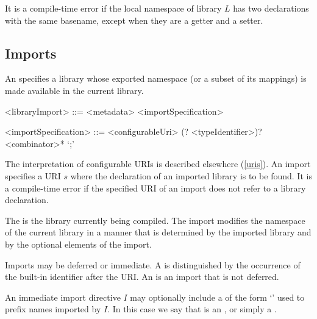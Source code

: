 \documentclass[makeidx]{article}
\begin{document}
{\LMHash{}%
It is a compile-time error if the local namespace of library $L$
has two declarations with the same basename,
except when they are a getter and a setter.



\subsection{Imports}

\LMHash{}%
An  specifies a library whose exported namespace
(or a subset of its mappings) is made available in the current library.

\begin{grammar}
<libraryImport> ::= <metadata> <importSpecification>

<importSpecification> ::= \gnewline{}
  \IMPORT{} <configurableUri>
  (\DEFERRED? \AS{} <typeIdentifier>)?
  <combinator>* `;'
\end{grammar}

\LMHash{}%
The interpretation of configurable URIs is described elsewhere
(\ref{uris}).
An import specifies a URI $s$
where the declaration of an imported library is to be found.
It is a compile-time error if the specified URI of an import
does not refer to a library declaration.

\LMHash{}%
The  is the library currently being compiled.
The import modifies the namespace of the current library
in a manner that is determined by the imported library and
by the optional elements of the import.

\LMHash{}%
Imports may be deferred or immediate.
A
is distinguished by the occurrence of
the built-in identifier \DEFERRED{} after the URI.
An
is an import that is not deferred.

\LMHash{}%
An immediate import directive $I$ may optionally include
a  of the form `\code{\AS\,\,\id}' used to prefix
names imported by $I$.
In this case we say that \id{} is an ,
or simply a .


}
\end{document}
